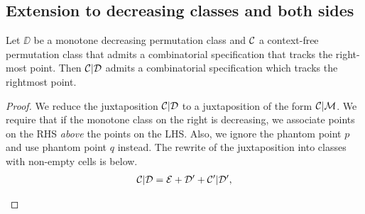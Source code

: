 \documentclass[12pt, a4paper, twoside]{report}
\begin{document}
\subsection{Extension to decreasing classes and both sides}
\label{sec:extensions}

\begin{proposition}
  \label{prop:decrappend}
  Let $\DD$ be a monotone decreasing permutation class and $\mathcal{C}$ a context-free permutation class that admits a combinatorial specification that tracks the right-most point. Then $\mathcal{C}|\mathcal{D}$ admits a combinatorial specification which tracks the rightmost point.
\end{proposition}
\begin{proof}
We reduce the juxtaposition $\mathcal{C}|\mathcal{D}$ to a juxtaposition of the form $\mathcal{C}|\mathcal{M}$. We require that if the monotone class on the right is decreasing, we associate points on the RHS \emph{above} the points on the LHS. Also, we ignore the phantom point $p$ and use phantom point $q$ instead. The rewrite of the juxtaposition into classes with non-empty cells is below.
\begin{align}
  \mathcal{C}|\mathcal{D} = \mathcal{E} + \mathcal{D}' + \mathcal{C}'|\mathcal{D}',
\label{eq:decrease_objective}
\end{align}
\begin{figure}[!ht]
  \centering
\end{figure}
\end{proof}
\end{document}
